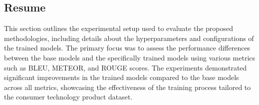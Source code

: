 \subsection{Resume}
This section outlines the experimental setup used to evaluate the proposed methodologies, including details about the hyperparameters and configurations of the trained models. The primary focus was to assess the performance differences between the base models and the specifically trained models using various metrics such as BLEU, METEOR, and ROUGE scores. The experiments demonstrated significant improvements in the trained models compared to the base models across all metrics, showcasing the effectiveness of the training process tailored to the consumer technology product dataset.